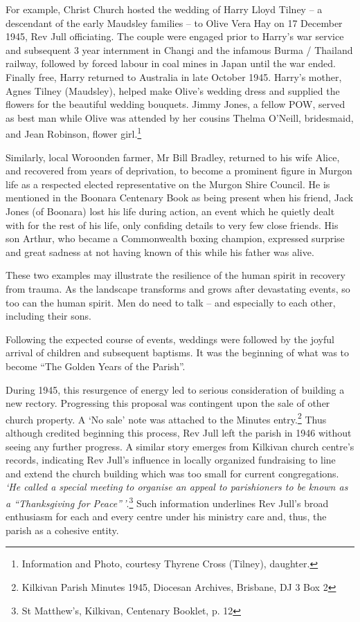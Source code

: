 For example, Christ Church hosted the wedding of Harry Lloyd Tilney -- a descendant of the early Maudsley families -- to Olive Vera Hay on 17 December 1945, Rev Jull officiating. The couple were engaged prior to Harry's war service and subsequent 3  year internment in Changi and the infamous Burma / Thailand railway, followed by forced labour in coal mines in Japan until the war ended. Finally free, Harry returned to Australia in late October 1945. Harry's mother, Agnes Tilney (Maudsley), helped make Olive's wedding dress and supplied the flowers for the beautiful wedding bouquets. Jimmy Jones, a fellow POW, served as best man while Olive was attended by her cousins Thelma O'Neill, bridesmaid, and Jean Robinson, flower girl.\footnote{Information and Photo, courtesy Thyrene Cross (Tilney), daughter.}


Similarly, local Woroonden farmer, Mr Bill Bradley, returned to his wife Alice, and recovered from years of deprivation, to become a prominent figure in Murgon life as a respected elected representative on the Murgon Shire Council. He is mentioned in the Boonara Centenary Book as being present when his friend, Jack Jones (of Boonara) lost his life during action, an event which he quietly dealt with for the rest of his life, only confiding details to very few close friends. His son Arthur, who became a Commonwealth boxing champion, expressed surprise and great sadness at not having known of this while his father was alive.



These two examples may illustrate the resilience of the human spirit in recovery from trauma. As the landscape transforms and grows after devastating events, so too can the human spirit. Men do need to talk -- and especially to each other, including their sons.



Following the expected course of events, weddings were followed by the joyful arrival of children and subsequent baptisms. It was the beginning of what was to become ``The Golden Years of the Parish''.



During 1945, this resurgence of energy led to serious consideration of building a new rectory. Progressing this proposal was contingent upon the sale of other church property. A `No sale' note was attached to the Minutes entry.\footnote{Kilkivan Parish Minutes 1945, Diocesan Archives, Brisbane, DJ 3 Box 2} Thus although credited beginning this process, Rev Jull left the parish in 1946 without seeing any further progress. A similar story emerges from Kilkivan church centre's records, indicating Rev Jull's influence in locally organized fundraising to line and extend the church building which was too small for current congregations. \emph{`He called a special meeting to organise an appeal to parishioners to be known as a ``Thanksgiving for Peace''\,'}.\footnote{St Matthew's, Kilkivan, Centenary Booklet, p. 12} Such information underlines Rev Jull's broad enthusiasm for each and every centre under his ministry care and, thus, the parish as a cohesive entity.


